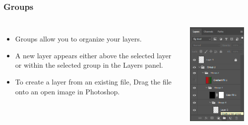 \documentclass{beamer}
\begin{document}
\begin{frame}
	\frametitle{Groups}
	\begin{columns}
	\vspace{-25pt}
	\begin{itemize}
		\item Groups allow you to organize your layers.
\item A new layer appears either above the selected layer or within the selected group in the Layers panel.
\item To create a layer from an existing file, Drag the file onto an open image in Photoshop.
	\end{itemize}
		\includegraphics[width = 0.85\textwidth]{images/groups.png}
\end{columns}
\end{frame}
\end{document}
